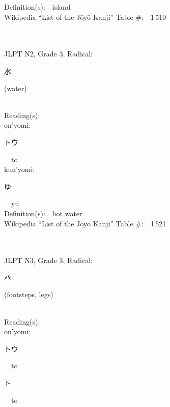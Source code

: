 \begin{multicols}{2}
Definition(s):\ \ island \\
Wikipedia ``List of the J\=oy\=o Kanji'' Table \#:\ \ 1\,510 \\
\ \ \\
{\fontsize{34pt}{40pt}  }\ \ \\  %
{JLPT N2, Grade 3, Radical:\ \ {\begin{CJK}{UTF8}{min} 水 \end{CJK}} (water) } \\
Reading(s):\ \ \\
{\hspace*{1em}}on'yomi:\ \ \\
{\hspace*{2em}}{\begin{CJK}{UTF8}{min} トウ \end{CJK}}\ \ t\=o\ \ \\
{\hspace*{1em}}kun'yomi:\ \ \\
{\hspace*{2em}}{\begin{CJK}{UTF8}{min} ゆ \end{CJK}}\ \ yu\ \ \\
Definition(s):\ \ hot water \\
Wikipedia ``List of the J\=oy\=o Kanji'' Table \#:\ \ 1\,521 \\
\ \ \\
{\fontsize{34pt}{40pt}  }\ \ \\  %
{JLPT N3, Grade 3, Radical:\ \ {\begin{CJK}{UTF8}{min} 癶 \end{CJK}} (footsteps, legs) } \\
Reading(s):\ \ \\
{\hspace*{1em}}on'yomi:\ \ \\
{\hspace*{2em}}{\begin{CJK}{UTF8}{min} トウ \end{CJK}}\ \ t\=o\ \ \\
{\hspace*{2em}}{\begin{CJK}{UTF8}{min} ト \end{CJK}}\ \ to\ \ \\

\end{multicols}
